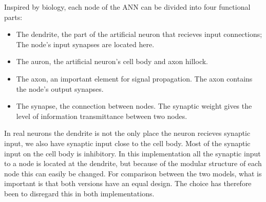 
		Inspired by biology, each node of the ANN can be divided into four functional parts:
		\begin{itemize}
			\item The dendrite, the part of the artificial neuron that recieves input connections; The node's input synapses are located here.
			\item The auron, the artificial neuron's cell body and axon hillock.
			\item The axon, an important element for signal propagation. The axon contains the node's output synapses. %
			\item The synapse, the connection between nodes. The synaptic weight gives the level of information transmittance between two nodes.
		\end{itemize}
		In real neurons the dendrite is not the only place the neuron recieves synaptic input, we also have synaptic input close to the cell body.
		Most of the synaptic input on the cell body is inhibitory\cite{PrinciplesOfNeuralScience4edKAP12}.
		In this implementation all the synaptic input to a node is located at the dendrite, but because of the modular structure of each node this can easily be changed.
		For comparison between the two models, what is important is that both versions have an equal design.
		The choice has therefore been to disregard this in both implementations.







